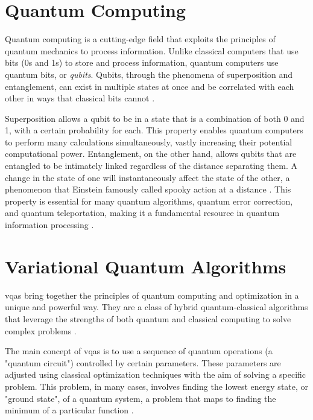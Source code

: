 \documentclass[
  a4paper,  %
  twoside,  %
  bibliography=totoc,
  headsepline,
  cleardoublepage=empty,
  parskip=half,
  draft=false
]{scrbook}
\begin{document}
\section{Quantum Computing}
\label{sec:quantumComputing}
Quantum computing is a cutting-edge field that exploits the principles of quantum mechanics to process information.
Unlike classical computers that use bits (0s and 1s) to store and process information, quantum computers use quantum bits, or \emph{qubits}.
Qubits, through the phenomena of superposition and entanglement, can exist in multiple states at once and be correlated with each other in ways that classical bits cannot \cite{Nielsen2010}.

Superposition allows a qubit to be in a state that is a combination of both 0 and 1, with a certain probability for each.
This property enables quantum computers to perform many calculations simultaneously, vastly increasing their potential computational power.
Entanglement, on the other hand, allows qubits that are entangled to be intimately linked regardless of the distance separating them.
A change in the state of one will instantaneously affect the state of the other, a phenomenon that Einstein famously called spooky action at a distance \cite{Einstein1935}.
This property is essential for many quantum algorithms, quantum error correction, and quantum teleportation, making it a fundamental resource in quantum information processing \cite{Nielsen2010,Preskill1998}.


\section{Variational Quantum Algorithms}
\label{sec:variationalQuantumAlgorithms}

\glspl{vqa} bring together the principles of quantum computing and optimization in a unique and powerful way.
They are a class of hybrid quantum-classical algorithms that leverage the strengths of both quantum and classical computing to solve complex problems \cite{McClean2016}.

The main concept of \glspl{vqa} is to use a sequence of quantum operations (a "quantum circuit") controlled by certain parameters.
These parameters are adjusted using classical optimization techniques with the aim of solving a specific problem.
This problem, in many cases, involves finding the lowest energy state, or "ground state", of a quantum system, a problem that maps to finding the minimum of a particular function \cite{Peruzzo2013}.
\end{document}
